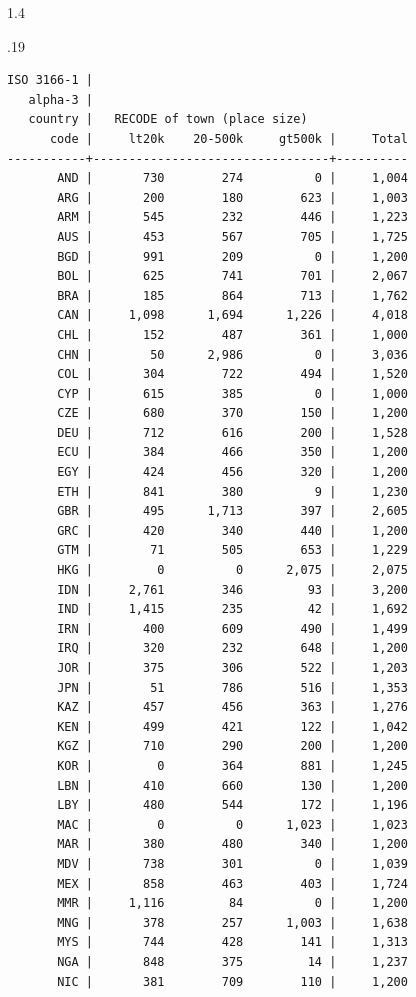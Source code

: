 \documentclass[10pt, letterpaper]{article}
\begin{document}
\begin{spacing}{1.4}
\begin{scriptsize}
\begin{spacing}{.19}
\begin{verbatim}
ISO 3166-1 |
   alpha-3 |
   country |   RECODE of town (place size)
      code |     lt20k    20-500k     gt500k |     Total
-----------+---------------------------------+----------
       AND |       730        274          0 |     1,004 
       ARG |       200        180        623 |     1,003 
       ARM |       545        232        446 |     1,223 
       AUS |       453        567        705 |     1,725 
       BGD |       991        209          0 |     1,200 
       BOL |       625        741        701 |     2,067 
       BRA |       185        864        713 |     1,762 
       CAN |     1,098      1,694      1,226 |     4,018 
       CHL |       152        487        361 |     1,000 
       CHN |        50      2,986          0 |     3,036 
       COL |       304        722        494 |     1,520 
       CYP |       615        385          0 |     1,000 
       CZE |       680        370        150 |     1,200 
       DEU |       712        616        200 |     1,528 
       ECU |       384        466        350 |     1,200 
       EGY |       424        456        320 |     1,200 
       ETH |       841        380          9 |     1,230 
       GBR |       495      1,713        397 |     2,605 
       GRC |       420        340        440 |     1,200 
       GTM |        71        505        653 |     1,229 
       HKG |         0          0      2,075 |     2,075 
       IDN |     2,761        346         93 |     3,200 
       IND |     1,415        235         42 |     1,692 
       IRN |       400        609        490 |     1,499 
       IRQ |       320        232        648 |     1,200 
       JOR |       375        306        522 |     1,203 
       JPN |        51        786        516 |     1,353 
       KAZ |       457        456        363 |     1,276 
       KEN |       499        421        122 |     1,042 
       KGZ |       710        290        200 |     1,200 
       KOR |         0        364        881 |     1,245 
       LBN |       410        660        130 |     1,200 
       LBY |       480        544        172 |     1,196 
       MAC |         0          0      1,023 |     1,023 
       MAR |       380        480        340 |     1,200 
       MDV |       738        301          0 |     1,039 
       MEX |       858        463        403 |     1,724 
       MMR |     1,116         84          0 |     1,200 
       MNG |       378        257      1,003 |     1,638 
       MYS |       744        428        141 |     1,313 
       NGA |       848        375         14 |     1,237 
       NIC |       381        709        110 |     1,200 

\end{verbatim}
\end{spacing}
\end{scriptsize}
\end{spacing}
\end{document}
